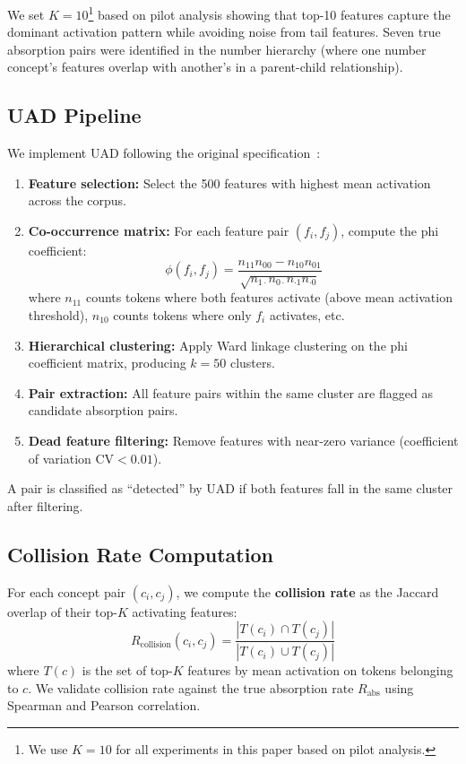 \documentclass{article}
\begin{document}
We set $K = 10$\footnote{We use $K = 10$ for all experiments in this paper based on pilot analysis.} based on pilot analysis showing that top-10 features capture the dominant activation pattern while avoiding noise from tail features. Seven true absorption pairs were identified in the number hierarchy (where one number concept's features overlap with another's in a parent-child relationship).

\subsection{UAD Pipeline}

We implement UAD following the original specification~\citep{chanin2024absorption}:
\begin{enumerate}
\item \textbf{Feature selection:} Select the 500 features with highest mean activation across the corpus.
\item \textbf{Co-occurrence matrix:} For each feature pair $(f_i, f_j)$, compute the phi coefficient:
\begin{equation}
\phi(f_i, f_j) = \frac{n_{11}n_{00} - n_{10}n_{01}}{\sqrt{n_{1\cdot}n_{0\cdot}n_{\cdot 1}n_{\cdot 0}}}
\end{equation}
where $n_{11}$ counts tokens where both features activate (above mean activation threshold), $n_{10}$ counts tokens where only $f_i$ activates, etc.
\item \textbf{Hierarchical clustering:} Apply Ward linkage clustering on the phi coefficient matrix, producing $k = 50$ clusters.
\item \textbf{Pair extraction:} All feature pairs within the same cluster are flagged as candidate absorption pairs.
\item \textbf{Dead feature filtering:} Remove features with near-zero variance (coefficient of variation $\text{CV} < 0.01$).
\end{enumerate}

A pair is classified as ``detected'' by UAD if both features fall in the same cluster after filtering.

\subsection{Collision Rate Computation}

For each concept pair $(c_i, c_j)$, we compute the \textbf{collision rate} as the Jaccard overlap of their top-$K$ activating features:
\begin{equation}
R_{\text{collision}}(c_i, c_j) = \frac{|T(c_i) \cap T(c_j)|}{|T(c_i) \cup T(c_j)|}
\end{equation}
where $T(c)$ is the set of top-$K$ features by mean activation on tokens belonging to $c$. We validate collision rate against the true absorption rate $R_{\text{abs}}$ using Spearman and Pearson correlation.
\end{document}
